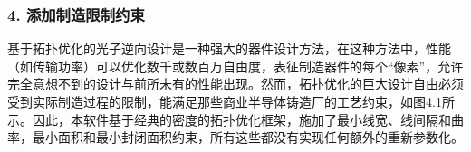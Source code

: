 \documentclass[letterpaper,10pt,english]{sphinxmanual}
\begin{document}
\subsubsection{4. 添加制造限制约束}
\label{\detokenize{_u7b80_u4ecb/_u6838_u5fc3_u8bbe_u8ba1_u4f18_u5316_u7b97_u6cd5/_u68af_u5ea6_u62d3_u6251_u4f18_u5316_u6a21_u5757/_u68af_u5ea6_u62d3_u6251_u4f18_u5316_u7b97_u6cd5:id14}}
\sphinxAtStartPar
基于拓扑优化的光子逆向设计是一种强大的器件设计方法，在这种方法中，性能（如传输功率）可以优化数千或数百万自由度，表征制造器件的每个“像素”，允许完全意想不到的设计与前所未有的性能出现。然而，拓扑优化的巨大设计自由必须受到实际制造过程的限制，能满足那些商业半导体铸造厂的工艺约束，如图4.1所示。因此，本软件基于经典的密度的拓扑优化框架，施加了最小线宽、线间隔和曲率，最小面积和最小封闭面积约束，所有这些都没有实现任何额外的重新参数化。

\end{document}
